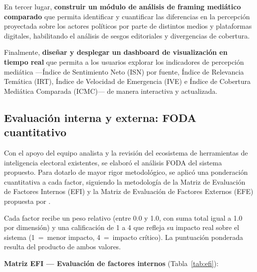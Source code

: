 En tercer lugar, \textbf{construir un módulo de análisis de framing mediático comparado} que permita identificar y cuantificar las diferencias en la percepción proyectada sobre los actores políticos por parte de distintos medios y plataformas digitales, habilitando el análisis de sesgos editoriales y divergencias de cobertura.

Finalmente, \textbf{diseñar y desplegar un dashboard de visualización en tiempo real} que permita a los usuarios explorar los indicadores de percepción mediática —Índice de Sentimiento Neto (ISN) por fuente, Índice de Relevancia Temática (IRT), Índice de Velocidad de Emergencia (IVE) e Índice de Cobertura Mediática Comparada (ICMC)— de manera interactiva y actualizada.

\subsection{Evaluación interna y externa: FODA cuantitativo}

Con el apoyo del equipo analista y la revisión del ecosistema de herramientas de inteligencia electoral existentes, se elaboró el análisis FODA del sistema propuesto. Para dotarlo de mayor rigor metodológico, se aplicó una ponderación cuantitativa a cada factor, siguiendo la metodología de la Matriz de Evaluación de Factores Internos (EFI) y la Matriz de Evaluación de Factores Externos (EFE) propuesta por \textcite{david2013strategic}.

Cada factor recibe un peso relativo (entre 0.0 y 1.0, con suma total igual a 1.0 por dimensión) y una calificación de 1 a 4 que refleja su impacto real sobre el sistema (1~=~menor impacto, 4~=~impacto crítico). La puntuación ponderada resulta del producto de ambos valores.

\textbf{Matriz EFI — Evaluación de factores internos} (Tabla~\ref{tab:efi}):

